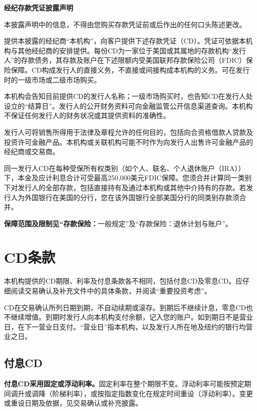 \documentclass[UTF8,fontset=none,11pt,a4paper]{ctexart}
\begin{document}
{\noindent\fontsize{20}{25}\selectfont\bfseries 经纪存款凭证披露声明\par}
\vspace{10pt}
本披露声明中的信息，不得由您购买存款凭证前或后作出的任何口头\allowbreak\mbox{陈述更改。}


提供本披露的经纪商“本机构”，向客户提供下述存款凭证（CD）。凭证可依据本机构与其他经纪商的安排提供。每份CD为一家位于美国或其属地的存款机构“发行人”的存款债务，其存款及账户在下述限额内受美国联邦存款保险公司（FDIC）保险保障。CD构成发行人的直接义务，不直接或间接构成本机构的义务。可在发行时的一级市场或二级市\allowbreak\mbox{场购买。}


本机构会告知目前提供CD的发行人名称；一级市场购买时，也告知CD在发行人处设立的“结算日”。发行人的公开财务资料可向金融监管公开信息渠道查询。本机构不保证任何发行人的财务状况或其提供资料\allowbreak\mbox{的准确性。}


发行人可将销售所得用于法律及章程允许的任何目的，包括向合资格借款人贷款及投资许可金融产品。本机构或关联机构可能不时作为向发行人出售许可金融产品的经纪商\allowbreak\mbox{或交易商。}


同一发行人CD在每种受保所有权类别（如个人、联名、个人退休账户（IRA））下，本金及应计利息合计可受最高250,000美元FDIC保障。您须合并计算同一类别下对发行人的全部存款，包括直接持有及通过本机构或其他中介持有的存款。若发行人为外国银行在美国的分行，您在该外国银行全部美国分行的同类别存款\allowbreak\mbox{须合并。}


\textbf{保障范围及限制见“存款保险：}一般规定”及“存款保险：退休计\allowbreak\mbox{划与账户”。}


\section*{CD条款}
本机构提供的CD期限、利率及付息条款各不相同，包括付息CD及零息CD。应仔细阅读交易确认及补充文件中的具体条款，并阅读“重要\allowbreak\mbox{投资考虑”。}


CD在交易确认所列日期到期，不自动续期或滚存。到期后不继续计息，零息CD也不继续增值。到期时发行人向本机构支付余额，记入您的账户。如到期日不是营业日，在下一营业日支付。“营业日”指本机构，以及发行人所在地及纽约的银行均\allowbreak\mbox{营业之日。}


\subsection*{付息CD}
\textbf{付息CD采用固定或浮动利率。}固定利率在整个期限不变。浮动利率可能按预定期间调升或调降（阶梯利率），或按指定指数变化在规定时间重设（浮动利率）。变更或重设日期及依据，见交易确认或\allowbreak\mbox{补充披露。}
\end{document}
